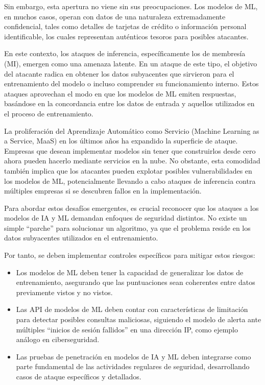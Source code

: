 \documentclass[11pt]{report}
\begin{document}
Sin embargo, esta apertura no viene sin sus preocupaciones. Los modelos de ML, en muchos casos, operan con datos de una naturaleza extremadamente
confidencial, tales como detalles de tarjetas de crédito o información personal identificable, los cuales representan auténticos tesoros para 
posibles atacantes.

En este contexto, los ataques de inferencia, específicamente los de membresía (MI), emergen como una amenaza latente. En un ataque de este tipo,
el objetivo del atacante radica en obtener los datos subyacentes que sirvieron para el entrenamiento del modelo o incluso comprender su funcionamiento
interno. Estos ataques aprovechan el modo en que los modelos de ML emiten respuestas, basándose en la concordancia entre los datos de entrada y aquellos
utilizados en el proceso de entrenamiento.

La proliferación del Aprendizaje Automático como Servicio (Machine Learning as a Service, MaaS) en los últimos años ha expandido la superficie de ataque.
Empresas que desean implementar modelos sin tener que construirlos desde cero ahora pueden hacerlo mediante servicios en la nube. No obstante, esta comodidad
también implica que los atacantes pueden explotar posibles vulnerabilidades en los modelos de ML, potencialmente llevando a cabo ataques de inferencia contra
múltiples empresas si se descubren fallos en la implementación.

Para abordar estos desafíos emergentes, es crucial reconocer que los ataques a los modelos de IA y ML demandan enfoques de seguridad distintos. No existe un
simple “parche” para solucionar un algoritmo, ya que el problema reside en los datos subyacentes utilizados en el entrenamiento.

Por tanto, se deben implementar controles específicos para mitigar estos riesgos:
\begin{itemize}
  \item Los modelos de ML deben tener la capacidad de generalizar los datos de entrenamiento, asegurando que las puntuaciones sean coherentes entre datos
  previamente vistos y no vistos.

  \item Las API de modelos de ML deben contar con características de limitación para detectar posibles consultas maliciosas, siguiendo el modelo de alerta
  ante múltiples “inicios de sesión fallidos” en una dirección IP, como ejemplo análogo en ciberseguridad.
  
  \item Las pruebas de penetración en modelos de IA y ML deben integrarse como parte fundamental de las actividades regulares de seguridad, desarrollando
  casos de ataque específicos y detallados.
\end{itemize}
\end{document}
